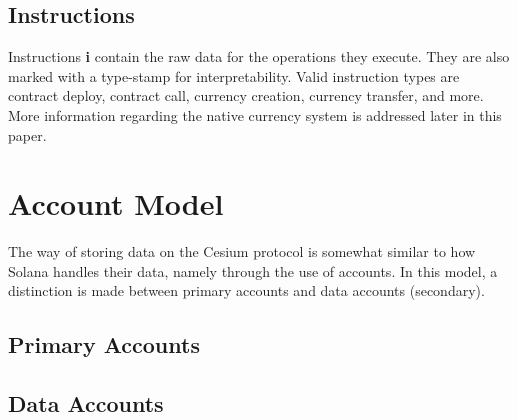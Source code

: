 \documentclass[letterpaper, 12pt]{article}
\begin{document}
\subsection{Instructions}

Instructions \textbf{i} contain the raw data for the operations they execute. They are also marked with a type-stamp for interpretability. Valid instruction types are contract deploy, contract call, currency creation, currency transfer, and more. More information regarding the native currency system is addressed later in this paper. 

\section{Account Model}

The way of storing data on the Cesium protocol is somewhat similar to how Solana handles their data, namely through the use of accounts. In this model, a distinction is made between primary accounts and data accounts (secondary).

\subsection{Primary Accounts}

\lipsum[1-2]

\subsection{Data Accounts}

\lipsum[1-2]



\end{document}
